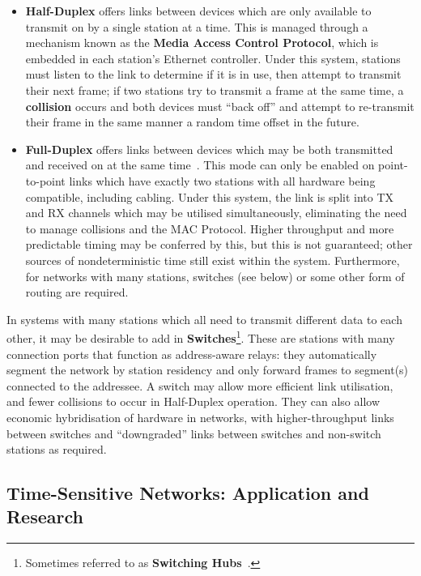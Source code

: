 \begin{itemize}
    \item \label{def:halfduplex} \textbf{Half-Duplex} offers links between devices which are only available to transmit on by a single station at a time.
        This is managed through a mechanism known as the \textbf{Media Access Control Protocol}, which is embedded in each station's Ethernet controller.
        Under this system, stations must listen to the link to determine if it is in use, then attempt to transmit their next frame; if two stations try to transmit a frame at the same time, a \textbf{collision} occurs and both devices must ``back off'' and attempt to re-transmit their frame in the same manner a random time offset in the future.
    \item \label{def:fullduplex} \textbf{Full-Duplex} offers links between devices which may be both transmitted and received on at the same time~\cite{spurgeonFullDuplexEthernet2000}.
        This mode can only be enabled on point-to-point links which have exactly two stations with all hardware being compatible, including cabling.
        Under this system, the link is split into TX and RX channels which may be utilised simultaneously, eliminating the need to manage collisions and the MAC Protocol.
        Higher throughput and more predictable timing may be conferred by this, but this is not guaranteed; other sources of nondeterministic time still exist within the system.
        Furthermore, for networks with many stations, switches (see below) or some other form of routing are required.
\end{itemize}

In systems with many stations which all need to transmit different data to each other, it may be desirable to add in \textbf{Switches}\footnote{Sometimes referred to as \textbf{Switching Hubs}~\cite{spurgeonEthernetSwitchingHubs2000}.}.
These are stations with many connection ports that function as address-aware relays: they automatically segment the network by station residency and only forward frames to segment(s) connected to the addressee\cite{spurgeonEthernetDefinitiveGuide2000}.
A switch may allow more efficient link utilisation, and fewer collisions to occur in Half-Duplex operation.
They can also allow economic hybridisation of hardware in networks, with higher-throughput links between switches and ``downgraded'' links between switches and non-switch stations as required.

\subsection{Time-Sensitive Networks: Application and Research}

